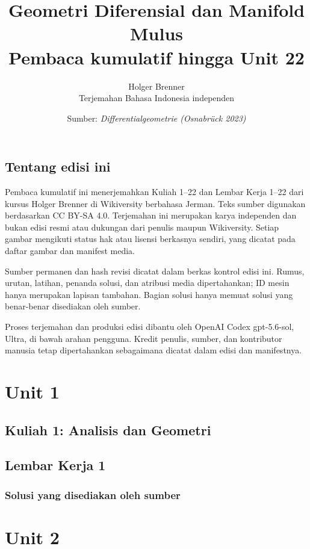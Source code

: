 \documentclass[11pt,a4paper,oneside]{book}
\title{Geometri Diferensial dan Manifold Mulus\\\large Pembaca kumulatif hingga Unit 22}
\author{Holger Brenner\\Terjemahan Bahasa Indonesia independen}
\date{Sumber: \textit{Differentialgeometrie (Osnabrück 2023)}}
\begin{document}
\hypersetup{pageanchor=false}
\maketitle
\hypersetup{pageanchor=true}
\frontmatter
\chapter*{Tentang edisi ini}
Pembaca kumulatif ini menerjemahkan Kuliah 1--22 dan Lembar Kerja 1--22 dari kursus Holger Brenner di Wikiversity berbahasa Jerman. Teks sumber digunakan berdasarkan CC BY-SA 4.0. Terjemahan ini merupakan karya independen dan bukan edisi resmi atau dukungan dari penulis maupun Wikiversity. Setiap gambar mengikuti status hak atau lisensi berkasnya sendiri, yang dicatat pada daftar gambar dan manifest media.

Sumber permanen dan hash revisi dicatat dalam berkas kontrol edisi ini. Rumus, urutan, latihan, penanda solusi, dan atribusi media dipertahankan; ID mesin hanya merupakan lapisan tambahan. Bagian solusi hanya memuat solusi yang benar-benar disediakan oleh sumber.

Proses terjemahan dan produksi edisi dibantu oleh OpenAI Codex gpt-5.6-sol, Ultra, di bawah arahan pengguna. Kredit penulis, sumber, dan kontributor manusia tetap dipertahankan sebagaimana dicatat dalam edisi dan manifestnya.
\tableofcontents

\mainmatter
\part{Unit 1}
\chapter[Kuliah 1]{Kuliah 1: Analisis dan Geometri}


\chapter{Lembar Kerja 1}


\section*{Solusi yang disediakan oleh sumber}


\part{Unit 2}
\end{document}
